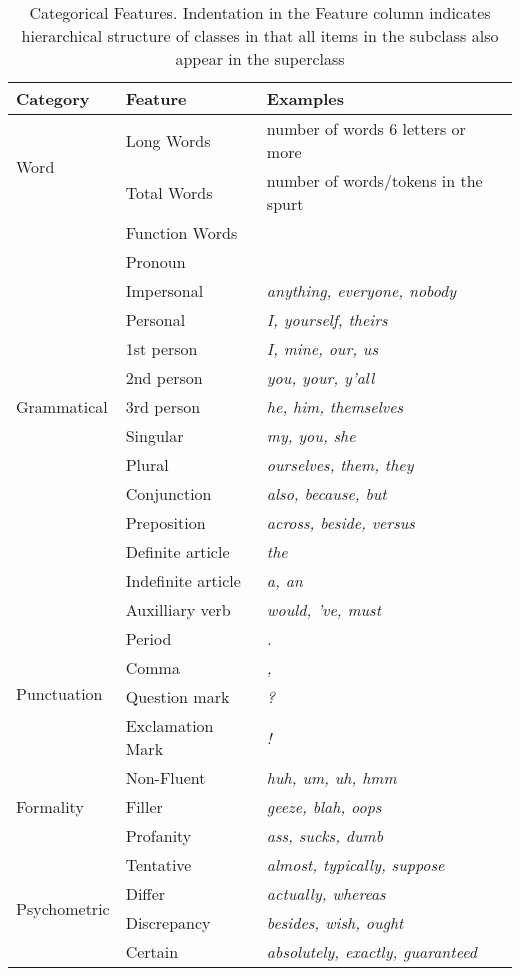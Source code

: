 \begin{table}
\centering
\begin{tabular}{l | l | l} 
	\textbf{Category} & \textbf{Feature} &  \textbf{Examples} \\
	\hline
	\multirow{2}{*}{Word} & Long Words & number of words 6 letters or more \\
	& Total Words & number of words/tokens in the spurt \\
	\hline
	\multirow{13}{*}{Grammatical} & Function Words      &  \\ 
	& \phantom{1} Pronoun                   &  \\  
	& \phantom{12} Impersonal    & \emph{anything, everyone, nobody} \\ 
	& \phantom{12} Personal      & \emph{I, yourself, theirs} \\ 
	& \phantom{123} 1st person  & \emph{I, mine, our, us} \\ 
	& \phantom{123} 2nd person  & \emph{you, your, y'all} \\ 
	& \phantom{123} 3rd person  & \emph{he, him, themselves} \\ 
	& \phantom{123} Singular    & \emph{my, you, she} \\ 
	& \phantom{123} Plural      & \emph{ourselves, them, they} \\ 
	& Conjunction      & \emph{also, because, but} \\ 
	& Preposition      & \emph{across, beside, versus} \\ 
	& Definite article & \emph{the} \\ 
	& Indefinite article & \emph{a, an} \\ 
	& Auxilliary verb   & \emph{would, 've, must} \\ 
	\hline 
	\multirow{4}{*}{Punctuation} & Period & \emph{.} \\ 
	& Comma            & \emph{,} \\ 
	& Question mark    & \emph{?} \\ 
	& Exclamation Mark & \emph{!} \\ 
	\hline
	\multirow{3}{*}{Formality} & Non-Fluent  & \emph{huh, um, uh, hmm}\\ 
	& Filler             & \emph{geeze, blah, oops} \\ 
	& Profanity          & \emph{ass, sucks, dumb} \\ 
	\hline 
	\multirow{4}{*}{Psychometric} & Tentative & \emph{almost, typically, suppose} \\ 
	& Differ             & \emph{actually, whereas} \\ 
	& Discrepancy        & \emph{besides, wish, ought}  \\
	& Certain            & \emph{absolutely, exactly, guaranteed}  \\  
\end{tabular}
\caption{Categorical Features.  Indentation in the Feature column indicates hierarchical structure of classes in that all items in the subclass also appear in the superclass} 
\label{tab:categorical_features} 
\end{table}



